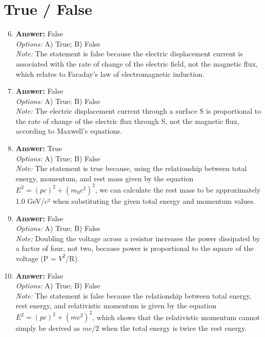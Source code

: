 \documentclass[12pt]{article}
\begin{document}
\section*{True / False}
\begin{enumerate}[label=\arabic*.]
\setcounter{enumi}{5}
\item \textbf{Answer:} False
\\ \textit{Options:} A) True; B) False
\\ \textit{Note:} The statement is false because the electric displacement current is associated with the rate of change of the electric field, not the magnetic flux, which relates to Faraday's law of electromagnetic induction.
\item \textbf{Answer:} False
\\ \textit{Options:} A) True; B) False
\\ \textit{Note:} The electric displacement current through a surface S is proportional to the rate of change of the electric flux through S, not the magnetic flux, according to Maxwell's equations.
\item \textbf{Answer:} True
\\ \textit{Options:} A) True; B) False
\\ \textit{Note:} The statement is true because, using the relationship between total energy, momentum, and rest mass given by the equation \(E^2 = (pc)^2 + (m_0 c^2)^2\), we can calculate the rest mass to be approximately 1.0 GeV/c² when substituting the given total energy and momentum values.
\item \textbf{Answer:} False
\\ \textit{Options:} A) True; B) False
\\ \textit{Note:} Doubling the voltage across a resistor increases the power dissipated by a factor of four, not two, because power is proportional to the square of the voltage (P = $V^2$/R).
\item \textbf{Answer:} False
\\ \textit{Options:} A) True; B) False
\\ \textit{Note:} The statement is false because the relationship between total energy, rest energy, and relativistic momentum is given by the equation \( E^2 = (pc)^2 + (mc^2)^2 \), which shows that the relativistic momentum cannot simply be derived as \( mc/2 \) when the total energy is twice the rest energy.
\end{enumerate}
\end{document}

